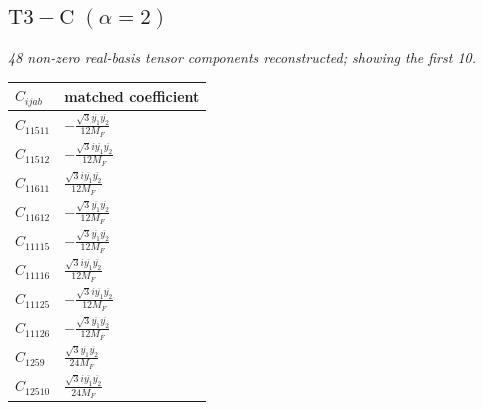 \documentclass[9pt]{article}
\begin{document}
\subsection*{$ \mathrm{T3-C}\;(\alpha=2) $}
\textit{48 non-zero real-basis tensor components reconstructed; showing the first 10.}
\begin{longtable}{@{}ll@{}}
\toprule
$C_{ijab}$ & matched coefficient \\
\midrule
$C_{11511}$ & $ - \frac{\sqrt{3} \overline{y_{1}} \overline{y_{2}}}{12 M_F} $ \\
$C_{11512}$ & $ - \frac{\sqrt{3} i \overline{y_{1}} \overline{y_{2}}}{12 M_F} $ \\
$C_{11611}$ & $ \frac{\sqrt{3} i \overline{y_{1}} \overline{y_{2}}}{12 M_F} $ \\
$C_{11612}$ & $ - \frac{\sqrt{3} \overline{y_{1}} \overline{y_{2}}}{12 M_F} $ \\
$C_{11115}$ & $ - \frac{\sqrt{3} \overline{y_{1}} \overline{y_{2}}}{12 M_F} $ \\
$C_{11116}$ & $ \frac{\sqrt{3} i \overline{y_{1}} \overline{y_{2}}}{12 M_F} $ \\
$C_{11125}$ & $ - \frac{\sqrt{3} i \overline{y_{1}} \overline{y_{2}}}{12 M_F} $ \\
$C_{11126}$ & $ - \frac{\sqrt{3} \overline{y_{1}} \overline{y_{2}}}{12 M_F} $ \\
$C_{1259}$ & $ \frac{\sqrt{3} \overline{y_{1}} \overline{y_{2}}}{24 M_F} $ \\
$C_{12510}$ & $ \frac{\sqrt{3} i \overline{y_{1}} \overline{y_{2}}}{24 M_F} $ \\
\bottomrule
\end{longtable}
\end{document}
